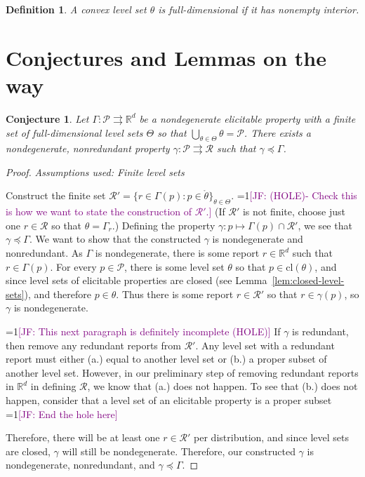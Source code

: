 \documentclass[12pt]{article}
\newcommand{\Comments}{1}
\newcommand{\mynote}[2]{\ifnum\Comments=1\textcolor{#1}{#2}\fi}
\newcommand{\jessie}[1]{\mynote{purple}{[JF: #1]}}
\newcommand{\reals}{\mathbb{R}}
\renewcommand{\P}{\mathcal{P}}
\newcommand{\R}{\mathcal{R}}
\newcommand{\inter}[1]{\mathring{#1}}%
\newcommand{\cl}[1]{\text{cl}(#1)}
\newcommand{\toto}{\rightrightarrows}
\newtheorem{definition}{Definition}
\newtheorem{conjecture}{Conjecture}
\begin{document}
\begin{definition}
	A convex level set $\theta$ is \emph{full-dimensional} if it has nonempty interior.
\end{definition}



\section{Conjectures and Lemmas on the way}

\begin{conjecture}\label{conj:gam-prime-exists}
	Let $\Gamma:\P \toto \reals^d$ be a nondegenerate elicitable property with a finite set of full-dimensional level sets $\Theta$ so that $\bigcup_{\theta \in \Theta}\theta = \P$.
	There exists a nondegenerate, nonredundant property $\gamma: \P \toto \R$ such that $\gamma \preceq \Gamma$. 
\end{conjecture}
\begin{proof}
\emph{Assumptions used: Finite level sets}

	
	Construct the finite set $\R' = \{r \in \Gamma(p) : p \in \inter{\theta} \}_{\theta \in \Theta}$. \jessie{(HOLE)- Check this is how we want to state the construction of $\R'$.}
	(If $\R'$ is not finite, choose just one $r \in \R$ so that $\theta = \Gamma_r$.)
	Defining the property $\gamma : p \mapsto \Gamma(p) \cap \R'$, we see that $\gamma \preceq \Gamma$.
	We want to show that the constructed $\gamma$ is nondegenerate and nonredundant.
	As $\Gamma$ is nondegenerate, there is some report $r \in \reals^d$ such that $r \in \Gamma(p)$.
	For every $p \in \P$, there is some level set $\theta$ so that $p \in \cl{\theta}$, and since level sets of elicitable properties are closed (see Lemma~\ref{lem:closed-level-sets}), and therefore $p \in \theta$.
	Thus there is some report $r \in \R'$ so that $r \in \gamma(p)$, so $\gamma$ is nondegenerate.

	\jessie{This next paragraph is definitely incomplete (HOLE)}
	If $\gamma$ is redundant, then remove any redundant reports from $\R'$.
	Any level set with a redundant report must either (a.) equal to another level set or (b.) a proper subset of another level set. 
	However, in our preliminary step of removing redundant reports in $\reals^d$ in defining $\R$, we know that (a.) does not happen.
	To see that (b.) does not happen, consider that a level set of an elicitable property is a proper subset 
	\jessie{End the hole here}
	
	Therefore, there will be at least one $r \in \R'$ per distribution, and since level sets are closed, $\gamma$ will still be nondegenerate.
	Therefore, our constructed $\gamma$ is nondegenerate, nonredundant, and $\gamma \preceq \Gamma$.
	
\end{proof}
\end{document}
